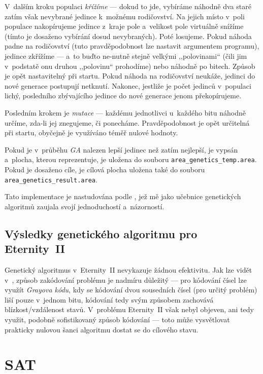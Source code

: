 \documentclass[11pt, titlepage]{report}
\begin{document}
V~dalším kroku populaci \emph{křížíme} --- dokud to jde, vybíráme náhodně dva staré zatím však nevybrané jedince k~možnému rodičovství. Na jejich místo v~poli populace nakopírujeme jedince z~kraje pole a~velikost pole virtuálně snížíme (tímto je dosaženo vybírání dosud nevybraných). Poté losujeme. Pokud náhoda padne na rodičovství (tuto pravděpodobnost lze nastavit argumentem programu), jedince zkřížíme --- a~to buďto ne-nutně stejně velkými ,,polovinami`` (čili jim v~podstatě onu druhou ,,polovinu`` prohodíme) nebo náhodně po bitech. Způsob je opět nastavitelný při startu. Pokud náhoda na rodičovství neukáže, jedinci do nové generace postupují netknutí. Nakonec, jestliže je počet jedinců v~populaci lichý, posledního zbývajícího jedince do nové generace jenom překopírujeme.

Posledním krokem je \emph{mutace} --- každému jednotlivci u~každého bitu náhodně určíme, zda-li jej znegujeme, či ponecháme. Pravděpodobnost je opět určitelná při startu, obyčejně je využíváno téměř nulové hodnoty.

Pokud je v~průběhu \emph{GA} nalezen lepší jedinec než zatím nejlepší, je vypsán a~plocha, kterou reprezentuje, je uložena do souboru \texttt{area\_genetics\_temp.area}. Pokud je dosaženo cíle, je cílová plocha uložena také do souboru \texttt{area\_genetics\_result.area}.

Tato implementace je nastudována podle \cite{ga-dipl}, jež mě jako učebnice genetických algoritmů zaujala svojí jednoduchostí a~názorností.

\section{Výsledky genetického algoritmu pro Eternity~II}
\label{sec:ga-ga-vysl}

Genetický algoritmus v~Eternity~II nevykazuje žádnou efektivitu. Jak lze vidět v~\cite{ga-dipl}, způsob zakódování problému je nadmíru důležitý --- pro kódování čísel lze využít \emph{Grayova kódu}, kdy se kódování dvou sousedních čísel (pro určitý problém) liší pouze v~jednom bitu, kódování tedy svým způsobem zachovává blízkost/vzdálenost stavů. V~problému Eternity~II však nebyl objeven, ani tedy využit, podobně sofistikovaný způsob kódování --- toto může vysvětlovat prakticky nulovou šanci algoritmu dostat se do cílového stavu.


\chapter{SAT}
\label{ch:sat}
\end{document}
